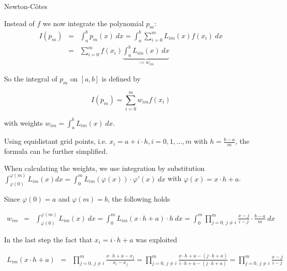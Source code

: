 \begin{vbframe}{Newton-C\^{o}tes}

Instead of $f$ we now integrate the polynomial $p_m$:
\begin{eqnarray*}
I(p_m) &=& \int_{a}^{b} p_m(x)~dx = \int_{a}^{b} \sum_{i = 0}^m L_{im}(x)f(x_{i})~dx \\
&=& \sum_{i = 0}^m f(x_{i}) \underbrace{\int_{a}^{b}  L_{im}(x)~dx}_{:=w_{im}}
\end{eqnarray*}

So the integral of $p_m$ on $[a, b]$ is defined by

$$
I(p_m) = \sum_{i = 0}^m w_{im} f(x_{i})
$$

with weights $w_{im} = \int_a^b L_{im}(x)~dx$.

\framebreak

Using equidistant grid points, i.e. $x_i = a + i \cdot h, i = 0, 1, ..., m$ with $h = \frac{b - a}{m}$, the formula can be further simplified.

\lz

When calculating the weights, we use integration by substitution $\int_{\varphi(0)}^{\varphi(m)} L_{im}(x) dx = \int_0^m L_{im}(\varphi(x))\cdot \varphi'(x)~dx $ with $\varphi(x) = x \cdot h + a$.

Since $\varphi(0) = a$ and $\varphi(m) = b$, the following holds

\begin{footnotesize}
\begin{eqnarray*}
w_{im} &=& \int_{\varphi(0)}^{\varphi(m)} L_{im}(x)~dx =  \int_0^m L_{im}(x \cdot h + a) \cdot h ~dx = \int_0^m \prod_{j = 0,\, j \not= i}^m \frac{x - j}{i - j} \cdot \frac{b - a}{m}~dx
\end{eqnarray*}
\end{footnotesize}

In the last step the fact that $x_i = i \cdot h + a$ was exploited

\begin{footnotesize}
\begin{eqnarray*}
L_{im}(x \cdot h + a) &=& \prod_{j = 0,\, j \not= i}^m \frac{x \cdot h + a  - x_{j}}{x_{i} - x_{j}} = \prod_{j = 0,\, j \not= i}^m \frac{x \cdot h + a  - (j \cdot h + a)}{i \cdot h + a - (j \cdot h + a)} = \prod_{j = 0,\, j \not= i}^m \frac{x - j}{i - j}
\end{eqnarray*}
\end{footnotesize}

\framebreak

%
%
%
%
%


\end{vbframe}
